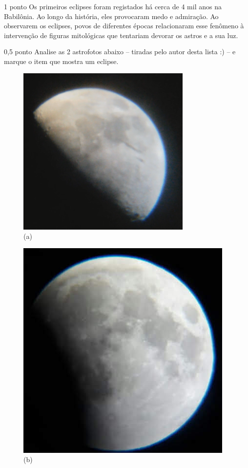 \documentclass{../lista}
\begin{document}

	\begin{questao}{1 ponto}
		Os primeiros eclipses foram registados há cerca de 4 mil anos na Babilônia. Ao longo da história, eles provocaram medo e admiração. Ao observarem os eclipses, povos de diferentes épocas relacionaram esse fenômeno à intervenção de figuras mitológicas que tentariam devorar os astros e a sua luz.

		\begin{pergunta}{0,5 ponto}
			Analise as 2 astrofotos abaixo -- tiradas pelo autor desta lista :) -- e marque o item que mostra um eclipse.
			\begin{multicols}{2}
				\begin{figure}[H]
					\centering
					\includegraphics[height=.75\linewidth]{./img/1a.png}
					\captionsetup{labelformat=empty}
					\caption{(a)}
				\end{figure}
				\begin{figure}[H]
					\centering
					\includegraphics[height=.75\linewidth]{./img/1b.jpg}
					\captionsetup{labelformat=empty}
					\caption{(b)}
				\end{figure}
			\end{multicols}
		\end{pergunta}


\end{questao}
\end{document}
